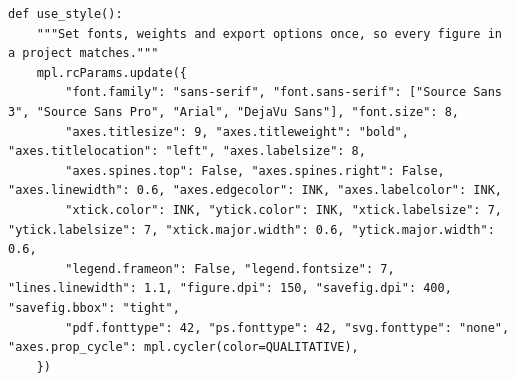 \begin{lstlisting}[firstnumber=33]
def use_style():
    """Set fonts, weights and export options once, so every figure in a project matches."""
    mpl.rcParams.update({
        "font.family": "sans-serif", "font.sans-serif": ["Source Sans 3", "Source Sans Pro", "Arial", "DejaVu Sans"], "font.size": 8,
        "axes.titlesize": 9, "axes.titleweight": "bold", "axes.titlelocation": "left", "axes.labelsize": 8,
        "axes.spines.top": False, "axes.spines.right": False, "axes.linewidth": 0.6, "axes.edgecolor": INK, "axes.labelcolor": INK,
        "xtick.color": INK, "ytick.color": INK, "xtick.labelsize": 7, "ytick.labelsize": 7, "xtick.major.width": 0.6, "ytick.major.width": 0.6,
        "legend.frameon": False, "legend.fontsize": 7, "lines.linewidth": 1.1, "figure.dpi": 150, "savefig.dpi": 400, "savefig.bbox": "tight",
        "pdf.fonttype": 42, "ps.fonttype": 42, "svg.fonttype": "none", "axes.prop_cycle": mpl.cycler(color=QUALITATIVE),
    })
\end{lstlisting}
